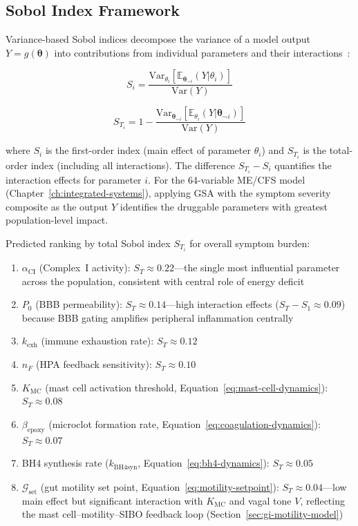 \subsection{Sobol Index Framework}

Variance-based Sobol indices decompose the variance of a model output $Y = g(\boldsymbol{\theta})$ into contributions from individual parameters and their interactions~\cite{Sobol2001}:

\begin{equation}
\label{eq:sobol-first}
S_i = \frac{\text{Var}_{\theta_i}[\mathbb{E}_{\boldsymbol{\theta}_{\sim i}}(Y | \theta_i)]}{\text{Var}(Y)}
\end{equation}

\begin{equation}
\label{eq:sobol-total}
S_{T_i} = 1 - \frac{\text{Var}_{\boldsymbol{\theta}_{\sim i}}[\mathbb{E}_{\theta_i}(Y | \boldsymbol{\theta}_{\sim i})]}{\text{Var}(Y)}
\end{equation}

where $S_i$ is the first-order index (main effect of parameter $\theta_i$) and $S_{T_i}$ is the total-order index (including all interactions). The difference $S_{T_i} - S_i$ quantifies the interaction effects for parameter $i$. For the 64-variable ME/CFS model (Chapter~\ref{ch:integrated-systems}), applying GSA with the symptom severity composite as the output $Y$ identifies the druggable parameters with greatest population-level impact.

Predicted ranking by total Sobol index $S_{T_i}$ for overall symptom burden:

\begin{enumerate}
    \item $\alpha_{\text{CI}}$ (Complex~I activity): $S_{T} \approx 0.22$---the single most influential parameter across the population, consistent with central role of energy deficit
    \item $P_0$ (BBB permeability): $S_{T} \approx 0.14$---high interaction effects ($S_T - S_1 \approx 0.09$) because BBB gating amplifies peripheral inflammation centrally
    \item $k_{\text{exh}}$ (immune exhaustion rate): $S_{T} \approx 0.12$
    \item $n_F$ (HPA feedback sensitivity): $S_{T} \approx 0.10$
    \item $K_{\text{MC}}$ (mast cell activation threshold, Equation~\ref{eq:mast-cell-dynamics}): $S_{T} \approx 0.08$
    \item $\beta_{\text{epoxy}}$ (microclot formation rate, Equation~\ref{eq:coagulation-dynamics}): $S_{T} \approx 0.07$
    \item BH4 synthesis rate ($k_{\text{BH4syn}}$, Equation~\ref{eq:bh4-dynamics}): $S_{T} \approx 0.05$
    \item $\mathcal{G}_{\text{set}}$ (gut motility set point, Equation~\ref{eq:motility-setpoint}): $S_{T} \approx 0.04$---low main effect but significant interaction with $K_{\text{MC}}$ and vagal tone $V$, reflecting the mast cell--motility--SIBO feedback loop (Section~\ref{sec:gi-motility-model})
\end{enumerate}

